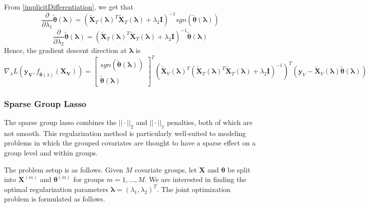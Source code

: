 \documentclass[10pt,letterpaper]{article}
\begin{document}
From \eqref{implicitDifferentiation}, we get that
\begin{equation}
\frac{\partial}{\partial \lambda_1} \tilde{\boldsymbol{\theta}}(\boldsymbol{\lambda}) =
(\tilde{\boldsymbol{X}}_T(\boldsymbol{\lambda})^T \tilde{\boldsymbol{X}}_T(\boldsymbol{\lambda}) + \lambda_2 \boldsymbol{I})^{-1}
sgn \left (\tilde{\boldsymbol{\theta}} (\boldsymbol{\lambda}) \right )
\end{equation}
\begin{equation}
\frac{\partial}{\partial \lambda_2} \tilde{\boldsymbol{\theta}}(\boldsymbol{\lambda}) = (\tilde{\boldsymbol{X}}_T(\boldsymbol{\lambda})^T\tilde{\boldsymbol{X}}_T(\boldsymbol{\lambda}) + \lambda_2 \boldsymbol{I})^{-1}\tilde{\boldsymbol{\theta}} (\boldsymbol{\lambda})
\end{equation}
Hence, the gradient descent direction at $\boldsymbol{\lambda}$ is
\begin{equation}
\nabla_{\lambda} L(\boldsymbol{y_V}, f_{\hat{\boldsymbol{\theta}}(\lambda)}(\boldsymbol{X_V})) =
\begin{bmatrix}
sgn(\tilde{\boldsymbol{\theta}} (\boldsymbol{\lambda}))\\
\tilde{\boldsymbol{\theta}} (\boldsymbol{\lambda})
\end{bmatrix}^T
(\tilde{\boldsymbol{X}}_V(\boldsymbol{\lambda})^T(\tilde{\boldsymbol{X}}_T(\boldsymbol{\lambda})^T \tilde{\boldsymbol{X}}_T(\boldsymbol{\lambda}) + \lambda_2 \boldsymbol{I})^{-1})^T
(\boldsymbol y_V - \tilde{\boldsymbol{X}}_V(\boldsymbol{\lambda}) \tilde{\boldsymbol{\theta}} (\boldsymbol{\lambda}))
\end{equation}

\subsubsection{Sparse Group Lasso}

The sparse group lasso combines the $||\cdot||_2$ and $||\cdot||_1$ penalties, both of which are not smooth. This regularization method is particularly well-suited to modeling problems in which the grouped covariates are thought to have a sparse effect on a group level and within groups.

The problem setup is as follows. Given $M$ covariate groups, let $\boldsymbol{X}$ and $\boldsymbol \theta$ be split into $\boldsymbol{X}^{(m)}$ and $\boldsymbol \theta^{(m)}$ for groups $m = 1, ... , M$. We are interested in finding the optimal regularization parameters $\boldsymbol{\lambda} = (\lambda_1, \lambda_2)^T$. The joint optimization problem is formulated as follows.
\end{document}
